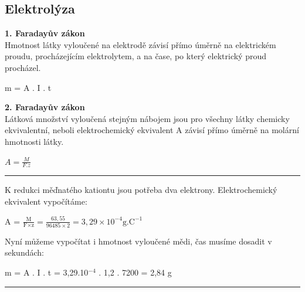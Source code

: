 \newpage

\subsection{Elektrolýza}

\textbf{1. Faradayův zákon}\\
Hmotnost látky vyloučené na elektrodě závisí přímo úměrně na elektrickém proudu, procházejícím elektrolytem, a na čase, po který elektrický proud procházel.

m = A . I . t

\textbf{2. Faradayův zákon}\\
Látková množství vyloučená stejným nábojem jsou pro všechny látky chemicky ekvivalentní, neboli elektrochemický ekvivalent A závisí přímo úměrně na molární hmotnosti látky.

$A = \frac{M}{F . z}$ \\

\hrule
{}

K redukci měďnatého kationtu jsou potřeba dva elektrony. Elektrochemický ekvivalent vypočítáme:

A = $\frac{\textrm{M}}{\textrm{F}\times\textrm{z}} = \frac{63,55}{96 485 \times 2} = 3,29\times10^{-4} \textrm{g.C}^{-1}$

Nyní můžeme vypočítat i hmotnost vyloučené mědi, čas musíme dosadit v sekundách:

m = A . I . t = 3,29.10$^{-4}$ . 1,2 . 7200 = 2,84 g


\hrule